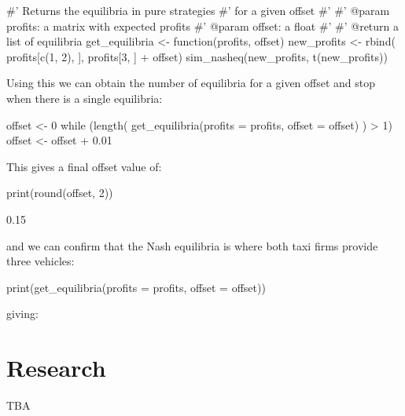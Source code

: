 \begin{Rin}
#' Returns the equilibria in pure strategies
#' for a given offset
#'
#' @param profits: a matrix with expected profits
#' @param offset: a float
#'
#' @return a list of equilibria
get_equilibria <- function(profits, offset){
    new_profits <- rbind(
                profits[c(1, 2), ],
                profits[3, ] + offset)
    sim_nasheq(new_profits, t(new_profits))
}
\end{Rin}

Using this we can obtain the number of equilibria for a given offset and stop
when there is a single equilibria:

\begin{Rin}
offset <- 0
while (length(
            get_equilibria(profits = profits, offset = offset)
            ) > 1){
    offset <- offset + 0.01
}
\end{Rin}

This gives a final offset value of:

\begin{Rin}
print(round(offset, 2))
\end{Rin}

\begin{Rout}
[1] 0.15
\end{Rout}

and we can confirm that the Nash equilibria is where both taxi firms provide
three vehicles:

\begin{Rin}
print(get_equilibria(profits = profits, offset = offset))
\end{Rin}

giving:



\section{Research}\label{sec:research}

TBA

